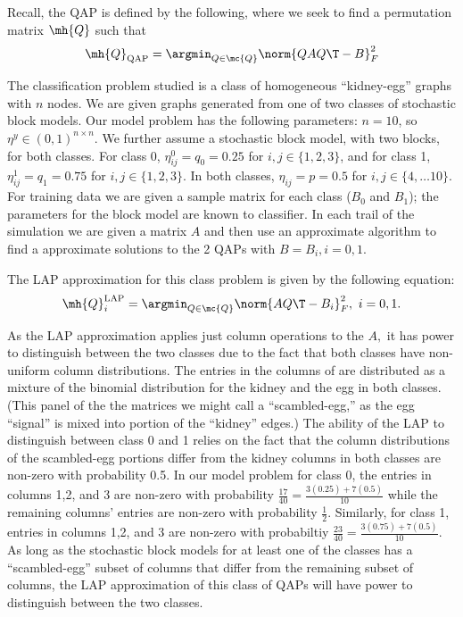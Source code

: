  
 Recall, the QAP is defined by the following, where we seek to 
 find a permutation matrix $\mh{Q}$ such that
 \begin{align} \label{eq:QAP}
	\mh{Q}_{\text{QAP}} = \argmin_{Q \in \mc{Q}} \norm{Q A Q\T - B}^2_F
\end{align}

 
 The classification problem studied is a class of  homogeneous 
 ``kidney-egg'' graphs with $n$ nodes.  
We are given graphs generated from one of two classes of
 stochastic block models.    Our model problem has the following parameters: $n=10$, so $\eta^y \in (0,1)^{n\times n}$.  We further assume a stochastic block model, with two blocks, for both classes.  For class 0, $\eta_{ij}^0=q_0=0.25$ for $i,j \in \{1,2,3\}$, and for class 1, $\eta_{ij}^1=q_1=0.75$ for $i,j \in \{1,2,3\}$.  In both classes, $\eta_{ij}=p=0.5$ for $i,j \in \{4,\ldots 10\}$.   For  training data we are given a sample matrix for
 each class ($B_{0}$ and $B_{1}$); the parameters for the block model are
 known to classifier.    In each trail of the simulation we are given a matrix
 $A$ and then use an approximate algorithm to find a 
approximate solutions to the 2 QAPs with $B=B_{i}, i=0,1.$ 


The LAP approximation  for this class problem is given by the following equation:
\begin{align} \label{eq:LAP}
	\mh{Q}^{\text{LAP}}_i = \argmin_{Q \in \mc{Q}} \norm{A Q\T - B_{i}}^2_F,~i=0,1.
\end{align}

As the LAP approximation applies just column operations
to the $A,$   it has power to distinguish between the two classes
due to the fact that both classes have non-uniform column distributions.
The entries in the columns of are distributed as a mixture of the
binomial distribution for the kidney and the egg in both classes. 
(This panel of the the matrices we might call a ``scambled-egg,'' as the
egg ``signal'' is mixed into portion of the ``kidney'' edges.)
 The ability of the LAP to distinguish between class 0 and 1 relies
 on the fact that the column distributions of the 
 scambled-egg portions differ from the kidney columns in both classes are
 non-zero with probability 0.5.  
In our model problem for class 0, the entries in columns 1,2, and 3 are non-zero
with probability $\frac{17}{40}=\frac {3(0.25)+7(0.5)}{10}$ 
while the remaining columns' entries
are non-zero with probability $\frac{1}{2}.$  Similarly, for class 1, entries in
columns 1,2, and 3   are non-zero with probabiltiy
$\frac{23}{40}=\frac{3(0.75)+7(0.5)}{10}.$  As long as the stochastic block
models for at least one of the classes has a ``scambled-egg'' subset of
columns that differ from the remaining subset of columns, the LAP approximation
of this class of QAPs will have power to distinguish between the two classes.


